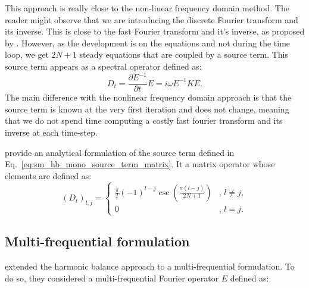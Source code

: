 This approach is really close to the non-linear frequency domain method.
The reader might observe that we are introducing the discrete Fourier
transform and its inverse. This is close to the fast Fourier transform
and it's inverse, as proposed by \citet{McMullen2001}. However,
as the development is on the equations and not during the time loop,
we get $2N+1$ steady equations that are coupled by a source term.
This source term appears as a spectral operator defined as:
\begin{equation}
	D_t = \frac{\partial E^{-1}}{\partial t} E = i \omega E^{-1} K E.
	\label{eq:sm_hb_mono_source_term_matrix}
\end{equation}
The main difference with the nonlinear frequency domain approach
is that the source term is known at the very first iteration and does
not change, meaning that we do not spend time computing a costly
fast fourier transform and its inverse at each time-step.

\citet{Gopinath2005} provide an analytical formulation of the
source term defined in Eq.~\ref{eq:sm_hb_mono_source_term_matrix}.
It a matrix operator whose elements are defined as:
\begin{equation}
  (D_t)_{l, j} =
  \begin{cases}
    \frac{\pi}{T}(-1)^{l-j}\csc\left(\frac{\pi
        (l-j)}{2N+1}\right) &, \, l\neq j,\\
    0 &, \, l=j.
  \end{cases}
\end{equation}

\subsection{Multi-frequential formulation}

\citet{Gopinath2007} extended the harmonic balance approach to
a multi-frequential formulation. To do so, they considered
a multi-frequential Fourier operator $E$ defined as:

